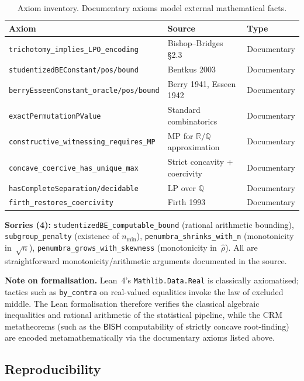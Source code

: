 \documentclass[11pt,a4paper]{article}
\theoremstyle{plain}
\theoremstyle{definition}
\newcommand{\BISH}{\textsf{BISH}}
\newcommand{\Q}{\mathbb{Q}}
\newcommand{\R}{\mathbb{R}}
\begin{document}
\begin{table}[ht]
\centering
\caption{Axiom inventory.  Documentary axioms model external mathematical facts.}
\label{tab:axioms}
\begin{tabular}{@{}lll@{}}
\toprule
\textbf{Axiom} & \textbf{Source} & \textbf{Type} \\
\midrule
\texttt{trichotomy\_implies\_LPO\_encoding} & Bishop--Bridges \S2.3 & Documentary \\
\texttt{studentizedBEConstant/pos/bound} & Bentkus 2003 & Documentary \\
\texttt{berryEsseenConstant\_oracle/pos/bound} & Berry 1941, Esseen 1942 & Documentary \\
\texttt{exactPermutationPValue} & Standard combinatorics & Documentary \\
\texttt{constructive\_witnessing\_requires\_MP} & MP for $\R/\Q$ approximation & Documentary \\
\texttt{concave\_coercive\_has\_unique\_max} & Strict concavity + coercivity & Documentary \\
\texttt{hasCompleteSeparation/decidable} & LP over $\Q$ & Documentary \\
\texttt{firth\_restores\_coercivity} & Firth 1993 & Documentary \\
\bottomrule
\end{tabular}
\end{table}

{\small\noindent\textbf{Sorries (4):}
\texttt{studentizedBE\_computable\_bound} (rational arithmetic bounding),
\texttt{subgroup\_penalty} (existence of $n_{\min}$),
\texttt{penumbra\_shrinks\_with\_n} (monotonicity in~$\sqrt{n}$),
\texttt{penumbra\_grows\_with\_skewness} (monotonicity in~$\hat\rho$).
All are straightforward monotonicity/arithmetic arguments documented in the source.}

\noindent\textbf{Note on formalisation.}  Lean~4's \texttt{Mathlib.Data.Real} is classically axiomatised; tactics such as \texttt{by\_contra} on real-valued equalities invoke the law of excluded middle.  The Lean formalisation therefore verifies the classical algebraic inequalities and rational arithmetic of the statistical pipeline, while the CRM metatheorems (such as the $\BISH$ computability of strictly concave root-finding) are encoded metamathematically via the documentary axioms listed above.

\subsection{Reproducibility}
\end{document}
